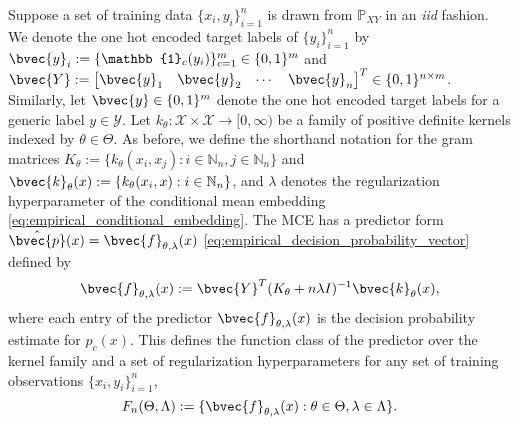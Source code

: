 \documentclass[runningheads, envcountsame, a4paper]{llncs}
\begin{document}
			Suppose a set of training data $\{x_{i}, y_{i}\}_{i = 1}^{n}$ is drawn from $\mathbb{P}_{X Y}$ in an \textit{iid} fashion. We denote the one hot encoded target labels of $\{y_{i}\}_{i = 1}^{n}$ by $\bvec{y}_{i} := \{\mathbb{1}_{c}(y_{i})\}_{c = 1}^{m} \in \{0, 1\}^{m}$ and $\bvec{Y} := \begin{bmatrix} \bvec{y}_{1} & \bvec{y}_{2} & \cdots & \bvec{y}_{n} \end{bmatrix}^{T} \in \{0, 1\}^{n \times m}$. Similarly, let $\bvec{y} \in \{0, 1\}^{m}$ denote the one hot encoded target labels for a generic label $y \in \mathcal{Y}$. Let $k_{\theta} : \mathcal{X} \times \mathcal{X} \to [0, \infty)$ be a family of positive definite kernels indexed by $\theta \in \Theta$. As before, we define the shorthand notation for the gram matrices $K_{\theta} := \{k_{\theta}(x_{i}, x_{j}) : i \in \mathbb{N}_{n}, j \in \mathbb{N}_{n}\}$ and $\bvec{k}_{\theta}(x) := \{k_{\theta}(x_{i}, x) : i \in \mathbb{N}_{n}\}$, and $\lambda$ denotes the regularization hyperparameter of the conditional mean embedding \eqref{eq:empirical_conditional_embedding}. The \gls{MCE} has a predictor form $\hat{\bvec{p}}(x) = \bvec{f}_{\theta, \lambda}(x)$ \eqref{eq:empirical_decision_probability_vector} defined by
			\begin{equation}
				\bvec{f}_{\theta, \lambda}(x) := \bvec{Y}^{T} (K_{\theta} + n \lambda I)^{-1} \bvec{k}_{\theta}(x),
			\label{eq:predictor}
			\end{equation}
			where each entry of the predictor $\bvec{f}_{\theta, \lambda}(x)$ is the decision probability estimate for $p_{c}(x)$. This defines the function class of the predictor over the kernel family and a set of regularization hyperparameters for any set of training observations $\{x_{i}, y_{i}\}_{i = 1}^{n}$,
			\begin{equation}
				F_{n}(\Theta, \Lambda) := \{ \bvec{f}_{\theta, \lambda}(x) : \theta \in \Theta, \lambda \in \Lambda \}.
			\label{eq:predictor_class}
			\end{equation}
			
\end{document}
